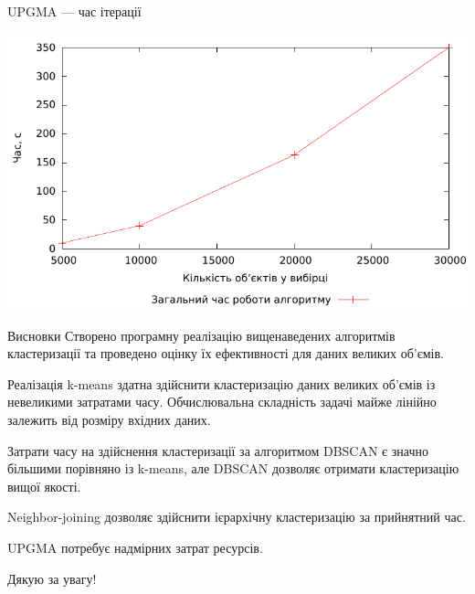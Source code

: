 \documentclass{beamer}
\begin{document}
    
    \begin{frame}{UPGMA --- час ітерації}
        \begin{center}
            \includegraphics[scale=0.8]{upgma_real_complexity.pdf}
        \end{center}
    \end{frame}
    
    \begin{frame}{Висновки}
        Створено програмну реалізацію вищенаведених алгоритмів кластеризації та проведено оцінку їх ефективності для даних великих об’ємів.
        
        Реалізація k-means здатна здійснити кластеризацію даних великих об’ємів із невеликими затратами часу. Обчислювальна складність задачі майже лінійно залежить від розміру вхідних даних.
        
        Затрати часу на здійснення кластеризації за алгоритмом DBSCAN є значно більшими порівняно із k-means, але DBSCAN дозволяє отримати кластеризацію вищої якості.
        
        Neighbor-joining дозволяє здійснити ієрархічну кластеризацію за прийнятний час. 
        
        UPGMA потребує надмірних затрат ресурсів.
    \end{frame}
    
    \begin{frame}{Дякую за увагу!}
    \end{frame}
    
\end{document}
